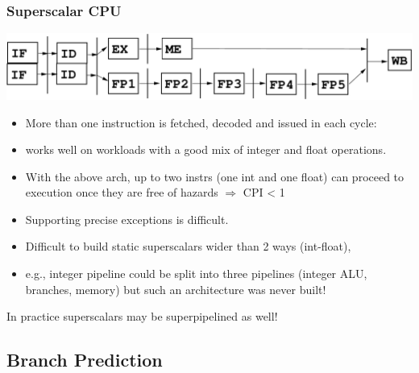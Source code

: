 \documentclass{beamer}
\renewcommand{\emph}[1]{\textcolor{structure}{#1}}
\newcommand{\emp}[1]{\textcolor{DikuRed}{ #1}}
\begin{document}
\begin{frame}[fragile,t]
\frametitle{Superscalar CPU}

\includegraphics[width=59ex]{Figures/SuperScalar}

\bigskip

\begin{scriptsize}
\begin{itemize}
\item More than one instruction is fetched, decoded and issued in each cycle:

\item works well on workloads with a good mix of integer and float operations.\smallskip

\item \emph{With the above arch, up to two instrs (one int and one float) can proceed
        to execution once they are free of hazards $\Rightarrow$ CPI < 1}\bigskip

\item \emp{Supporting precise exceptions is difficult}.
\item \emp{Difficult to build static superscalars wider than 2 ways (int-float)},
\item e.g., integer pipeline could be split into three pipelines 
        (integer ALU, branches, memory) but such an architecture was never built!\bigskip
\end{itemize}
\end{scriptsize}

In practice superscalars may be superpipelined as well!

\end{frame}

\subsection{Branch Prediction}
\end{document}
